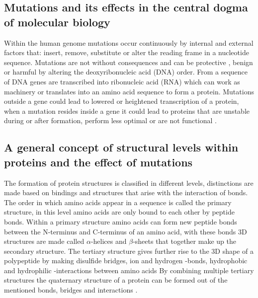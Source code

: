 \subsection{Mutations and its effects in the central dogma of molecular biology}
Within the human genome mutations occur continuously by internal and external factors that: insert, remove, substitute or alter the reading frame in a nucleotide sequence.
Mutations are not without consequences and can be protective \cite{harper_protective_2015}, benign or harmful by altering the deoxyribonucleic acid (DNA) order.
From a sequence of DNA genes are transcribed into ribonucleic acid (RNA) which can work as machinery or translates into an amino acid sequence to form a protein. 
Mutations outside a gene could lead to lowered or heightened transcription of a protein, when a mutation resides inside a gene it could lead to proteins that are unstable during or after formation, perform less optimal or are not functional \cite{nih_sickle_nodate,nih_cystic_nodate,nih_traps_2016}.

\subsection{A general concept of structural levels within proteins and the effect of mutations}
The formation of protein structures is classified in different levels, distinctions are made based on bindings and structures that arise with the interaction of bonds. 
The order in which amino acids appear in a sequence is called the primary structure, in this level amino acids are only bound to each other by peptide bonds. 
Within a primary structure amino acids can form new peptide bonds between the N-terminus and C-terminus of an amino acid, with these bonds 3D structures are made called $\alpha$-helices and $\beta$-sheets that together make up the secondary structure.
The tertiary structure gives further rise to the 3D shape of a polypeptide by making disulfide bridges, ion and hydrogen -bonds, hydrophobic and hydrophilic -interactions between amino acids
By combining multiple tertiary structures the quaternary structure of a protein can be formed out of the mentioned bonds, bridges and interactions \cite{wikipedia_protein_2019, bennion_protein_2002}.

